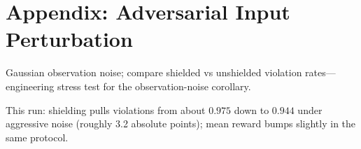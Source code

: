 \section{Appendix: Adversarial Input Perturbation}

\begin{table}[H]
\centering

\caption{Observation-noise stress test comparing shielded and unshielded control.}
\label{tab:adversarial-input-perturbation}
\end{table}

Gaussian observation noise; compare shielded vs unshielded violation rates---engineering stress test for the observation-noise corollary.

This run: shielding pulls violations from about $0.975$ down to $0.944$ under aggressive noise (roughly 3.2 absolute points); mean reward bumps slightly in the same protocol.
